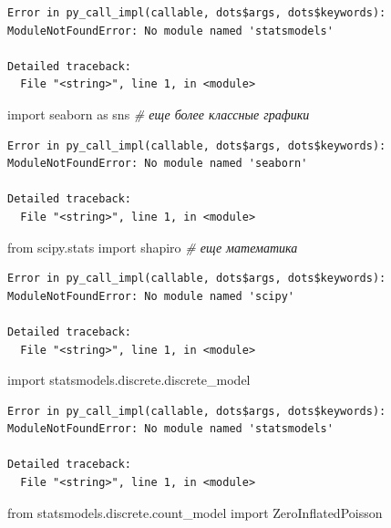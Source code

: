 \documentclass[]{book}
\newenvironment{Shaded}{\begin{snugshade}}{\end{snugshade}}
\newcommand{\CommentTok}[1]{\textcolor[rgb]{0.56,0.35,0.01}{\textit{#1}}}
\newcommand{\ImportTok}[1]{#1}
\newcommand{\NormalTok}[1]{#1}
\begin{document}
\begin{verbatim}
Error in py_call_impl(callable, dots$args, dots$keywords): ModuleNotFoundError: No module named 'statsmodels'

Detailed traceback: 
  File "<string>", line 1, in <module>
\end{verbatim}

\begin{Shaded}
\begin{Highlighting}[]
\ImportTok{import}\NormalTok{ seaborn }\ImportTok{as}\NormalTok{ sns }\CommentTok{# еще более классные графики}
\end{Highlighting}
\end{Shaded}

\begin{verbatim}
Error in py_call_impl(callable, dots$args, dots$keywords): ModuleNotFoundError: No module named 'seaborn'

Detailed traceback: 
  File "<string>", line 1, in <module>
\end{verbatim}

\begin{Shaded}
\begin{Highlighting}[]
\ImportTok{from}\NormalTok{ scipy.stats }\ImportTok{import}\NormalTok{ shapiro }\CommentTok{# еще математика}
\end{Highlighting}
\end{Shaded}

\begin{verbatim}
Error in py_call_impl(callable, dots$args, dots$keywords): ModuleNotFoundError: No module named 'scipy'

Detailed traceback: 
  File "<string>", line 1, in <module>
\end{verbatim}

\begin{Shaded}
\begin{Highlighting}[]
\ImportTok{import}\NormalTok{ statsmodels.discrete.discrete_model}
\end{Highlighting}
\end{Shaded}

\begin{verbatim}
Error in py_call_impl(callable, dots$args, dots$keywords): ModuleNotFoundError: No module named 'statsmodels'

Detailed traceback: 
  File "<string>", line 1, in <module>
\end{verbatim}

\begin{Shaded}
\begin{Highlighting}[]
\ImportTok{from}\NormalTok{ statsmodels.discrete.count_model }\ImportTok{import}\NormalTok{ ZeroInflatedPoisson}
\end{Highlighting}
\end{Shaded}
\end{document}
